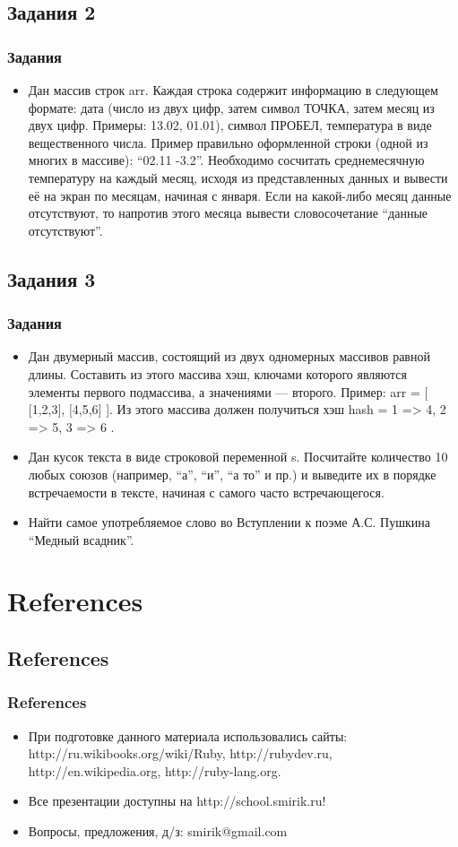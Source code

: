 \documentclass[compress,red]{beamer}
\begin{document}
\subsection{Задания 2}
\begin{frame}
  \frametitle{Задания}
  \begin{itemize}
    \item Дан массив строк arr. Каждая строка содержит информацию в следующем формате: дата (число из двух цифр, затем символ ТОЧКА, затем месяц из двух цифр. Примеры: 13.02, 01.01), символ ПРОБЕЛ, температура в виде вещественного числа. Пример правильно оформленной строки (одной из многих в массиве): ``02.11 -3.2''. Необходимо сосчитать среднемесячную температуру на каждый месяц, исходя из представленных данных и вывести её на экран по месяцам, начиная с января. Если на какой-либо месяц данные отсутствуют, то напротив этого месяца вывести словосочетание ``данные отсутствуют''.
  \end{itemize}
\end{frame}

\subsection{Задания 3}
\begin{frame}
  \frametitle{Задания}
  \begin{itemize}
    \item Дан двумерный массив, состоящий из двух одномерных массивов равной длины. Составить из этого массива хэш, ключами которого являются элементы первого подмассива, а значениями --- второго. Пример: arr = [ [1,2,3], [4,5,6] ]. Из этого массива должен получиться хэш hash = { 1 => 4, 2 => 5, 3 => 6 }.
    \item Дан кусок текста в виде строковой переменной s. Посчитайте количество 10 любых союзов (например, ``а'', ``и'', ``а то'' и пр.) и выведите их в порядке встречаемости в тексте, начиная с самого часто встречающегося.
    \item Найти самое употребляемое слово во Вступлении к поэме А.С. Пушкина ``Медный всадник''.
  \end{itemize}
\end{frame}

\section{References}
\subsection{References}
\begin{frame}[fragile]
  \frametitle{References}
  \begin{itemize}
    \item При подготовке данного материала использовались сайты: http://ru.wikibooks.org/wiki/Ruby, http://rubydev.ru, http://en.wikipedia.org, http://ruby-lang.org.
    \item Все презентации доступны на http://school.smirik.ru!
    \item Вопросы, предложения, д/з: smirik@gmail.com
  \end{itemize}
\end{frame}
\end{document}
